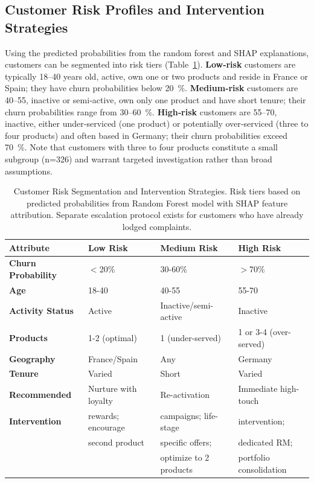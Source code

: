 \documentclass[12pt]{article}
\begin{document}
\subsection{Customer Risk Profiles and Intervention Strategies}
Using the predicted probabilities from the random forest and SHAP explanations, customers can be segmented into risk tiers (Table~\ref{tab:risk_profiles}).  \textbf{Low‑risk} customers are typically 18–40 years old, active, own one or two products and reside in France or Spain; they have churn probabilities below 20~\%.  \textbf{Medium‑risk} customers are 40–55, inactive or semi‑active, own only one product and have short tenure; their churn probabilities range from 30–60~\%.  \textbf{High‑risk} customers are 55–70, inactive, either under‑serviced (one product) or potentially over‑serviced (three to four products) and often based in Germany; their churn probabilities exceed 70~\%.  Note that customers with three to four products constitute a small subgroup (n=326) and warrant targeted investigation rather than broad assumptions.

\begin{table}[H]
\centering
\caption{Customer Risk Segmentation and Intervention Strategies. Risk tiers based on predicted probabilities from Random Forest model with SHAP feature attribution. Separate escalation protocol exists for customers who have already lodged complaints.}
\label{tab:risk_profiles}
\begin{tabular}{p{2.5cm}p{3.5cm}p{3.5cm}p{3.5cm}}
\toprule
\textbf{Attribute} & \textbf{Low Risk} & \textbf{Medium Risk} & \textbf{High Risk} \\
\midrule
\textbf{Churn Probability} & $<$20\% & 30-60\% & $>$70\% \\
\textbf{Age} & 18-40 & 40-55 & 55-70 \\
\textbf{Activity Status} & Active & Inactive/semi-active & Inactive \\
\textbf{Products} & 1-2 (optimal) & 1 (under-served) & 1 or 3-4 (over-served) \\
\textbf{Geography} & France/Spain & Any & Germany \\
\textbf{Tenure} & Varied & Short & Varied \\
\midrule
\textbf{Recommended} & Nurture with loyalty & Re-activation & Immediate high-touch \\
\textbf{Intervention} & rewards; encourage & campaigns; life-stage & intervention; \\
& second product & specific offers; & dedicated RM; \\
& & optimize to 2 products & portfolio consolidation \\
\bottomrule
\end{tabular}
\end{table}
\end{document}
